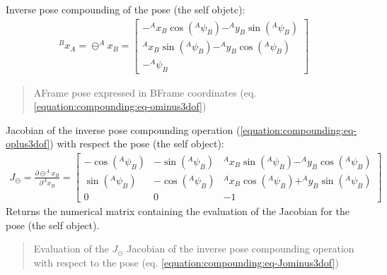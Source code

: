 \documentclass[letterpaper,10pt,english]{sphinxmanual}
\begin{document}
\begin{fulllineitems}
\begin{fulllineitems}
\label{\detokenize{compounding:Pose3D.Pose3D.ominus}}
\pysigstartsignatures
{}
\pysigstopsignatures
\sphinxAtStartPar
Inverse pose compounding of the  pose (the self objetc):
\begin{equation}\label{equation:compounding:eq-ominus3dof}
\begin{split}^Bx_A = \ominus ^Ax_B =
\begin{bmatrix}
    -^Ax_B \cos(^A\psi_B) - ^Ay_B \sin(^A\psi_B) \\
    ^Ax_B \sin(^A\psi_B) - ^Ay_B \cos(^A\psi_B) \\
    -^A\psi_B
\end{bmatrix}\end{split}
\end{equation}\begin{quote}\begin{description}
\sphinxAtStartPar
A\sphinxhyphen{}Frame pose expressed in B\sphinxhyphen{}Frame coordinates (eq. \eqref{equation:compounding:eq-ominus3dof})

\end{description}\end{quote}

\end{fulllineitems}


\begin{fulllineitems}
\label{\detokenize{compounding:Pose3D.Pose3D.J_ominus}}
\pysigstartsignatures
{}
\pysigstopsignatures
\sphinxAtStartPar
Jacobian of the inverse pose compounding operation (\eqref{equation:compounding:eq-oplus3dof}) with respect the pose  (the self object):
\begin{equation}\label{equation:compounding:eq-Jominus3dof}
\begin{split}J_{\ominus}=\frac{\partial  \ominus ^Ax_B}{\partial ^Ax_B} =
\begin{bmatrix}
    -\cos(^A\psi_B) & -\sin(^A\psi_B) &  ^Ax_B \sin(^A\psi_B) - ^Ay_B \cos(^A\psi_B) \\
    \sin(^A\psi_B) & -\cos(^A\psi_B) &  ^Ax_B \cos(^A\psi_B) + ^Ay_B \sin(^A\psi_B) \\
    0 & 0 & -1
\end{bmatrix}\end{split}
\end{equation}
\sphinxAtStartPar
Returns the numerical matrix containing the evaluation of the Jacobian for the pose  (the self object).
\begin{quote}\begin{description}
\sphinxAtStartPar
Evaluation of the \(J_{\ominus}\) Jacobian of the inverse pose compounding operation with respect to the pose (eq. \eqref{equation:compounding:eq-Jominus3dof})


\end{description}
\end{quote}
\end{fulllineitems}
\end{fulllineitems}
\end{document}

